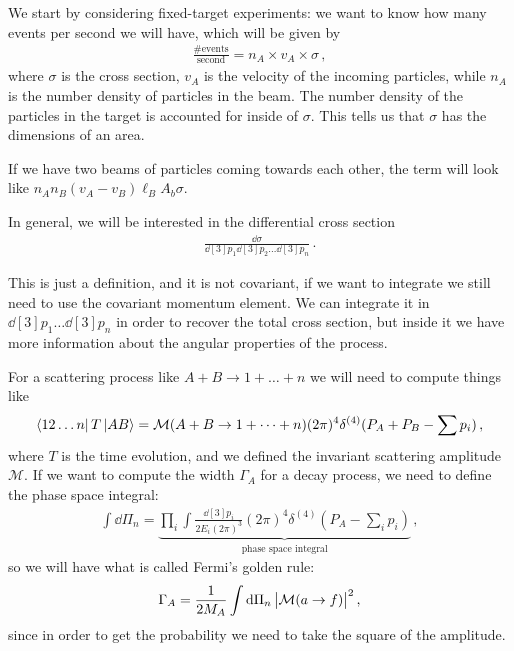 \documentclass[main.tex]{subfiles}
\begin{document}
We start by considering fixed-target experiments: we want to know how many events per second we will have, which will be given by 
%
\begin{align}
\frac{\text{\# events}}{\text{second}} = n_A \times v_A \times \sigma 
\,,
\end{align}
%
where \(\sigma \) is the cross section, \(v_A\) is the velocity of the incoming particles, while \(n_A\) is the number density of particles in the beam. The number density of the particles in the target is accounted for inside of \(\sigma \). 
This tells us that \(\sigma\) has the dimensions of an area. 

If we have two beams of particles coming towards each other, the term will look like \(n_A n_B (v_A - v_B) \ell_B A_b \sigma \). 

In general, we will be interested in the differential cross section 
%
\begin{align}
\frac{ \dd{\sigma }}{ \dd[3]{p_1 } \dd[3]{p_2 } \dots \dd[3]{p_{n}}}
\,.
\end{align}

This is just a definition, and it is not covariant, if we want to integrate we still need to use the covariant momentum element. We can integrate it in \(\dd[3]{p_1} \dots \dd[3]{p_n}\) in order to recover the total cross section, but inside it we have more information about the angular properties of the process.

For a scattering process like \(A+B \rightarrow 1 + \dots + n\)
we will need to compute things like 
%
\begin{align} \label{eq:s-matrix-element-feynman-amplitude-decay}
\bra{12 \dots n} T \ket{AB} = \mathcal{M} (A+B \rightarrow 1 + \dots + n) (2\pi )^{4} \delta^{(4)} (P_A + P_B - \sum p_i)
\,,
\end{align}
%
where \(T\) is the time evolution, and we defined the invariant scattering amplitude \(\mathcal{M}\). 
If we want to compute the width \(\Gamma_{A}\) for a decay process, we need to define the phase space integral:
%
\begin{align}
\int \dd{\Pi_{n}} = \underbrace{\prod_{i} \int \frac{ \dd[3]{p_i}}{2 E_i (2 \pi )^3} 
(2\pi )^{4} \delta^{(4)} (P_A - \sum _{i} p_i)}_{\text{phase space integral}}
\,,
\end{align}
%
so we will have what is called Fermi's golden rule:
%
\begin{align}
\Gamma_{A} = \frac{1}{2 M_A} \int \dd{\Pi_{n}} \abs{\mathcal{M} (a \rightarrow f)}^2
\,,
\end{align}
%
since in order to get the probability we need to take the square of the amplitude. 
\end{document}
